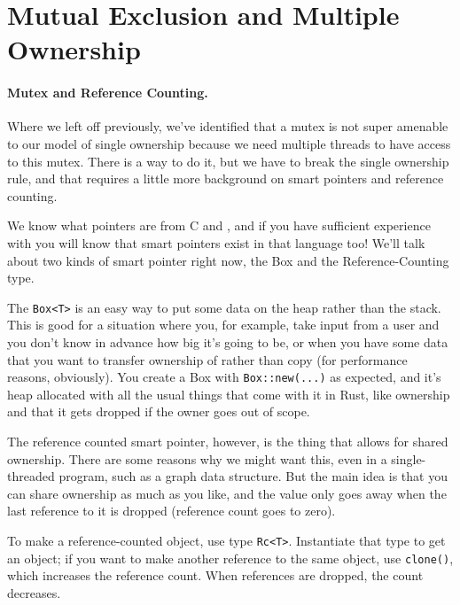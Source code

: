 




\section*{Mutual Exclusion and Multiple Ownership}

\paragraph{Mutex and Reference Counting.}

Where we left off previously, we've identified that a mutex is not super amenable to our model of single ownership because we need multiple threads to have access to this mutex. There is a way to do it, but we have to break the single ownership rule, and that requires a little more background on smart pointers and reference counting.

We know what pointers are from C and \CPP, and if you have sufficient experience with \CPP{} you will know that smart pointers exist in that language too! We'll talk about two kinds of smart pointer right now, the Box and the Reference-Counting type.

The \texttt{Box<T>} is an easy way to put some data on the heap rather than the stack. This is good for a situation where you, for example, take input from a user and you don't know in advance how big it's going to be, or when you have some data that you want to transfer ownership of rather than copy (for performance reasons, obviously). You create a Box with \texttt{Box::new(...)} as expected, and it's heap allocated with all the usual things that come with it in Rust, like ownership and that it gets dropped if the owner goes out of scope.

The reference counted smart pointer, however, is the thing that allows for shared ownership. There are some reasons why we might want this, even in a single-threaded program, such as a graph data structure. But the main idea is that you can share ownership as much as you like, and the value only goes away when the last reference to it is dropped (reference count goes to zero). 

To make a reference-counted object, use type \texttt{Rc<T>}. Instantiate that type to get an object; if you want to make another reference to the same object, use \texttt{clone()}, which increases the reference count. When references are dropped, the count decreases.

